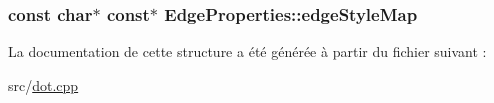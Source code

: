 \subsubsection[{edge\+Style\+Map}]{\setlength{\rightskip}{0pt plus 5cm}const char$\ast$ const$\ast$ Edge\+Properties\+::edge\+Style\+Map}\label{struct_edge_properties_a7938928bf27311c0e4acf2c40e0f0510}


La documentation de cette structure a été générée à partir du fichier suivant \+:\begin{DoxyCompactItemize}
\item 
src/\hyperlink{dot_8cpp}{dot.\+cpp}\end{DoxyCompactItemize}
